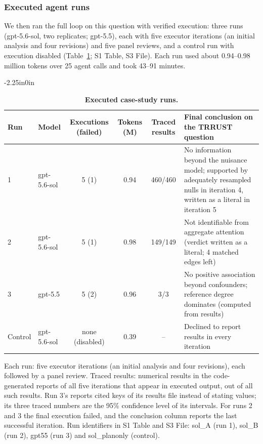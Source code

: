 \documentclass[10pt,letterpaper]{article}
\begin{document}
\subsubsection*{Executed agent runs}

We then ran the full loop on this question with verified execution: three runs (gpt-5.6-sol, two replicates; gpt-5.5), each with five executor iterations (an initial analysis and four revisions) and five panel reviews, and a control run with execution disabled (Table~\ref{table_case}; S1 Table, S3 File). Each run used about 0.94--0.98 million tokens over 25 agent calls and took 43--91 minutes.

\begin{table}[!ht]
\begin{adjustwidth}{-2.25in}{0in}
\centering
\caption{{\bf Executed case-study runs.}}
\label{table_case}
\begin{tabular}{@{}llcccp{6.2cm}@{}}
\hline
\textbf{Run} & \textbf{Model} & \textbf{Executions (failed)} & \textbf{Tokens (M)} & \textbf{Traced results} & \textbf{Final conclusion on the TRRUST question} \\ \hline
1 & gpt-5.6-sol & 5 (1) & 0.94 & 460/460 & No information beyond the nuisance model; supported by adequately resampled nulls in iteration 4, written as a literal in iteration 5 \\
2 & gpt-5.6-sol & 5 (1) & 0.98 & 149/149 & Not identifiable from aggregate attention (verdict written as a literal; 4 matched edges left) \\
3 & gpt-5.5 & 5 (2) & 0.96 & 3/3 & No positive association beyond confounders; reference degree dominates (computed from results) \\
Control & gpt-5.6-sol & none (disabled) & 0.39 & -- & Declined to report results in every iteration \\ \hline
\end{tabular}
\begin{flushleft} Each run: five executor iterations (an initial analysis and four revisions), each followed by a panel review. Traced results: numerical results in the code-generated reports of all five iterations that appear in executed output, out of all such results. Run 3's reports cited keys of its results file instead of stating values; its three traced numbers are the 95\% confidence level of its intervals. For runs 2 and 3 the final execution failed, and the conclusion column reports the last successful iteration. Run identifiers in S1 Table and S3 File: sol\_A (run 1), sol\_B (run 2), gpt55 (run 3) and sol\_planonly (control).
\end{flushleft}
\end{adjustwidth}
\end{table}
\end{document}
